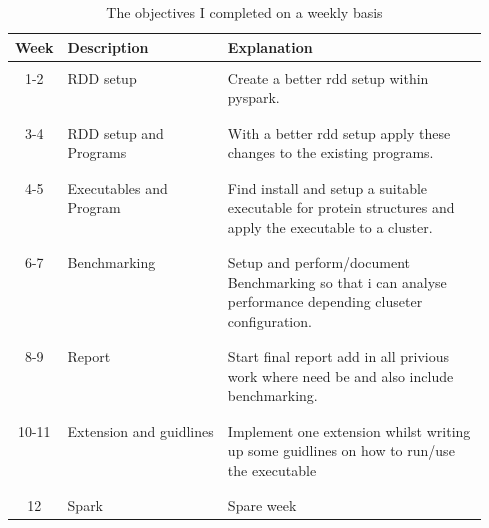 \documentclass[]{final_report}
\begin{document}
\vspace{40px}

\begin{table}[h!]
    \begin{center}
        \begin{tabular}{c|l|p{0.55\linewidth}}
        Week & Description & Explanation\\
        \hline
        \\
        1-2 & RDD setup & Create a better rdd setup within pyspark.\\
        \\
        \hline
        \\
        3-4 & RDD setup and Programs & With a better rdd setup apply these changes to the existing programs.\\
        \\
        \hline
        \\
        4-5 & Executables and Program & Find install and setup a suitable executable for protein structures and apply the executable to a cluster.\\
        \\
        \hline
        \\
        6-7 & Benchmarking & Setup and perform/document Benchmarking so that i can analyse performance depending cluseter configuration.\\
        \\
        \hline
        \\
        8-9 & Report & Start final report add in all privious work where need be and also include benchmarking.\\
        \\
        \hline
        \\
        10-11 & Extension and guidlines & Implement one extension whilst writing up some guidlines on how to run/use the executable\\
        \\
        \hline
        \\
        12 & Spark & Spare week\\
        \end{tabular}
        \caption{\label{tab:Timeline}The objectives I completed on a weekly basis}
    \end{center}
\end{table}
\end{document}
